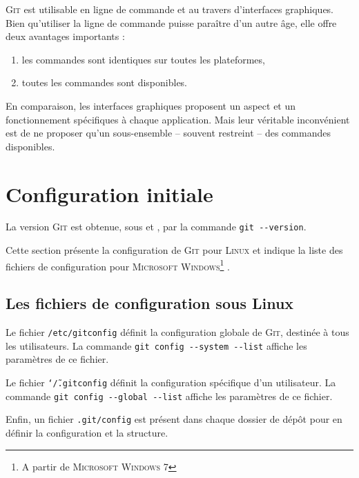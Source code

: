 \documentclass[11pt,twoside,headings=normal,open=right,french,DIV=12]{scrreprt}
\newcommand{\git}{\textsc{Git}}
\newcommand{\spec}[1]{\texttt{#1}}
\begin{document}
    
    \git{} est utilisable en ligne de commande et au travers d'interfaces graphiques. Bien qu'utiliser la ligne de
    commande puisse paraître d'un autre âge, elle offre deux avantages importants :
    \begin{enumerate}
        \item les commandes sont identiques sur toutes les plateformes,
        \item toutes les commandes sont disponibles.
    \end{enumerate}
    
    En comparaison, les interfaces graphiques proposent un aspect et un fonctionnement spécifiques à chaque application.
    Mais leur véritable inconvénient est de ne proposer qu'un sous-ensemble -- souvent restreint -- des commandes
    disponibles.



\section{Configuration initiale}



La version \git{} est obtenue, sous  et , par la commande \verb|git --version|.


    Cette section présente la configuration de \git{} pour \textsc{Linux} et indique la liste des fichiers de configuration
    pour \textsc{Microsoft Windows}\footnote{A partir de \textsc{Microsoft Windows 7}} .



\subsection{Les fichiers de configuration sous Linux}



    Le fichier \spec{/etc/gitconfig} définit la configuration globale de \git, destinée à tous les utilisateurs.
    La commande \verb|git config --system --list| affiche les paramètres de ce fichier.
    
    Le fichier \spec{\char`\~/.gitconfig} définit la configuration spécifique d'un utilisateur. La commande
    \verb|git config --global --list| affiche les paramètres de ce fichier.
    
    Enfin, un fichier \spec{.git/config} est présent dans chaque dossier de dépôt pour en définir la configuration
    et la structure.
\end{document}
